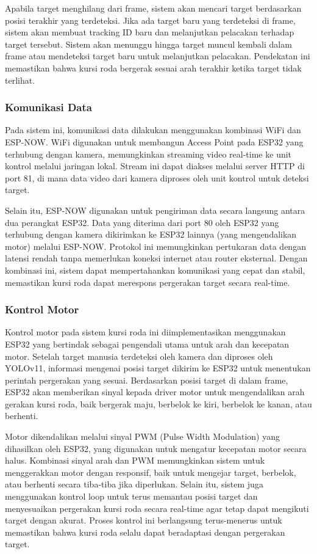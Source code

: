 Apabila target menghilang dari frame, sistem akan mencari target berdasarkan posisi terakhir yang terdeteksi. Jika ada target baru yang terdeteksi di frame, sistem akan membuat tracking ID baru dan melanjutkan pelacakan terhadap target tersebut. Sistem akan menunggu hingga target muncul kembali dalam frame atau mendeteksi target baru untuk melanjutkan pelacakan. Pendekatan ini memastikan bahwa kursi roda bergerak sesuai arah terakhir ketika target tidak terlihat.

\subsubsection{Komunikasi Data}
\label{subsubsec:komunikasi_data}

Pada sistem ini, komunikasi data dilakukan menggunakan kombinasi WiFi dan ESP-NOW. WiFi digunakan untuk membangun Access Point pada ESP32 yang terhubung dengan kamera, memungkinkan streaming video real-time ke unit kontrol melalui jaringan lokal. Stream ini dapat diakses melalui server HTTP di port 81, di mana data video dari kamera diproses oleh unit kontrol untuk deteksi target.

Selain itu, ESP-NOW digunakan untuk pengiriman data secara langsung antara dua perangkat ESP32. Data yang diterima dari port 80 oleh ESP32 yang terhubung dengan kamera dikirimkan ke ESP32 lainnya (yang mengendalikan motor) melalui ESP-NOW. Protokol ini memungkinkan pertukaran data dengan latensi rendah tanpa memerlukan koneksi internet atau router eksternal. Dengan kombinasi ini, sistem dapat mempertahankan komunikasi yang cepat dan stabil, memastikan kursi roda dapat merespons pergerakan target secara real-time.

\subsubsection{Kontrol Motor}
\label{subsubsec:kontrol_motor}

Kontrol motor pada sistem kursi roda ini diimplementasikan menggunakan ESP32 yang bertindak sebagai pengendali utama untuk arah dan kecepatan motor. Setelah target manusia terdeteksi oleh kamera dan diproses oleh YOLOv11, informasi mengenai posisi target dikirim ke ESP32 untuk menentukan perintah pergerakan yang sesuai. Berdasarkan posisi target di dalam frame, ESP32 akan memberikan sinyal kepada driver motor untuk mengendalikan arah gerakan kursi roda, baik bergerak maju, berbelok ke kiri, berbelok ke kanan, atau berhenti.

Motor dikendalikan melalui sinyal PWM (Pulse Width Modulation) yang dihasilkan oleh ESP32, yang digunakan untuk mengatur kecepatan motor secara halus. Kombinasi sinyal arah dan PWM memungkinkan sistem untuk menggerakkan motor dengan responsif, baik untuk mengejar target, berbelok, atau berhenti secara tiba-tiba jika diperlukan. Selain itu, sistem juga menggunakan kontrol loop untuk terus memantau posisi target dan menyesuaikan pergerakan kursi roda secara real-time agar tetap dapat mengikuti target dengan akurat. Proses kontrol ini berlangsung terus-menerus untuk memastikan bahwa kursi roda selalu dapat beradaptasi dengan pergerakan target.

